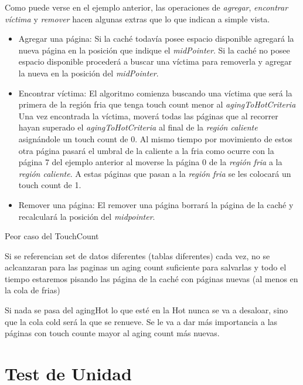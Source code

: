 \documentclass[11pt, a4paper, spanish]{article}
\begin{document}
Como puede verse en el ejemplo anterior, las operaciones de \textit{agregar}, \textit{encontrar víctima} y \textit{remover} hacen algunas extras que lo que indican a simple vista.

\begin{itemize}
	\item{Agregar una p\'agina:
		Si la cach\'e todav\'ia posee espacio disponible agregar\'a la nueva p\'agina en la posici\'on que indique el \textit{midPointer}.
		Si la cach\'e no posee espacio disponible proceder\'a a buscar una v\'ictima para removerla y agregar la nueva en la posici\'on del \textit{midPointer}.
	}
	\item{Encontrar v\'ictima: }
		El algoritmo comienza buscando una v\'ictima que ser\'a la primera de la regi\'on fria que tenga touch count menor al \textit{agingToHotCriteria}
		Una vez encontrada la v\'ictima, mover\'a todas las p\'aginas que al recorrer hayan superado el  \textit{agingToHotCriteria} al
		final de la \textit{regi\'on caliente} asign\'andole un touch count de 0. Al mismo tiempo por movimiento de estos otra p\'agina pasar\'a
		el umbral de la caliente a la fria como ocurre con la p\'agina 7 del ejemplo anterior al moverse la p\'agina 0 de la \textit{regi\'on fria}
		a la \textit{regi\'on caliente}. A estas p\'aginas que pasan a la \textit{regi\'on fria} se les colocar\'a un touch count de 1.
		
	\item{Remover una p\'agina: }
		El remover una p\'agina borrar\'a la p\'agina de la cach\'e y recalcular\'a la posici\'on del \textit{midpointer}.
\end{itemize}



Peor caso del TouchCount

Si se referencian set de datos diferentes (tablas diferentes) cada vez, no se aclcanzaran para las paginas un aging count suficiente
para salvarlas y todo el tiempo estaremos pisando las p\'agina de la caché con p\'aginas nuevas (al menos en la cola de frias)

Si nada se pasa del agingHot lo que esté en la Hot nunca se va a desaloar, sino que la cola cold ser\'a la que se renueve.
Se le va a dar m\'as importancia a las p\'aginas con touch counte mayor al aging count m\'as nuevas.

\newpage
\section{Test de Unidad}
\end{document}
